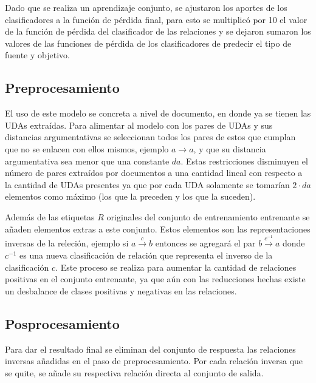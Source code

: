 Dado que se realiza un aprendizaje conjunto, se ajustaron los aportes de los clasificadores 
a la función de pérdida final, para esto se multiplicó por 10 el valor de la función de pérdida 
del clasificador de las relaciones y se dejaron sumaron los valores de las funciones de pérdida 
de los clasificadores de predecir el tipo de fuente y objetivo.

\subsection{Preprocesamiento}

El uso de este modelo se concreta a nivel de documento, en donde ya se tienen las UDAs extraídas. Para alimentar
al modelo con los pares de UDAs y sus distancias argumentativas se seleccionan todos los pares de estos que cumplan
que no se enlacen con ellos mismos, ejemplo $a \rightarrow a$, y que su distancia argumentativa sea menor que una
constante $da$. Estas restricciones disminuyen el número de pares extraídos por documentos a una cantidad lineal 
con respecto a la cantidad de UDAs presentes ya que por cada UDA solamente se tomarían $2 \cdot da$ elementos como máximo
(los que la preceden y los que la suceden). 

Además de las etiquetas $R$ originales del conjunto de entrenamiento entrenante se añaden elementos extras a este
conjunto. Estos elementos son las representaciones inversas de la releción, ejemplo si $a \xrightarrow{c} b$ entonces 
se agregará el par $b \xrightarrow{c^{-1}} a$ donde $c^{-1}$ es una nueva clasificación de relación que representa
el inverso de la clasificación $c$. Este proceso se realiza para aumentar la cantidad de relaciones positivas en el
conjunto entrenante, ya que aún con las reducciones hechas existe un desbalance de clases positivas y negativas en
las relaciones.

\subsection{Posprocesamiento}

Para dar el resultado final se eliminan del conjunto de respuesta las relaciones inversas añadidas en el paso de 
preprocesamiento. Por cada relación inversa que se quite, se añade su respectiva relación directa al conjunto
de salida.

\newpage

